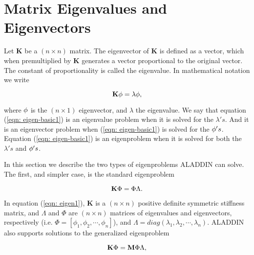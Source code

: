 \clearpage
\section{Matrix Eigenvalues and Eigenvectors}

\vspace{0.15 in}
\noindent\hspace{0.50 in}
Let {\bf K} be a $(n \times n)$ matrix.
The eigenvector of {\bf K} is defined as a vector, which when
premultiplied by {\bf K} generates a vector proportional to the original vector.
The constant of proportionality is called the eigenvalue.
In mathematical notation we write

\begin{equation}
{\bf K} {\bf \phi} = \lambda {\bf \phi},
\label{eqn: eigen-basic1}
\end{equation}

\vspace{0.15 in}\noindent
where ${\bf \phi}$ is the $(n \times 1)$ eigenvector, and $\lambda$ the eigenvalue.
We say that equation (\ref{eqn: eigen-basic1})
is an eigenvalue problem when it is solved for the $\lambda's$.
And it is an eigenvector problem
when (\ref{eqn: eigen-basic1}) is solved for the ${\bf \phi}'s$.
Equation (\ref{eqn: eigen-basic1}) is an eigenproblem when it is solved
for both the $\lambda's$ and ${\bf \phi}'s$.

\vspace{0.15 in}
\noindent\hspace{0.50 in}
In this section we describe the two types of
eigenproblems ALADDIN can solve. The first, and simpler case,
is the standard eigenproblem

\begin{equation}
{\bf K} \Phi = \Phi \Lambda.
\label{eqn: eigen1}
\end{equation}

\vspace{0.15 in}\noindent
In equation (\ref{eqn: eigen1}), {\bf K} is a $(n \times n)$ positive definite
symmetric stiffness matrix, and $\Lambda$ and $\Phi$ are $(n \times n)$ matrices of
eigenvalues and eigenvectors,
respectively (i.e. $\Phi = \left[ \phi_1, \phi_2, \cdots , \phi_n \right]$),
and $\Lambda = diag(\lambda_1, \lambda_2, \cdots, \lambda_n)$.
ALADDIN also supports solutions to the generalized eigenproblem

\begin{equation}
{\bf K} \Phi = {\bf M} \Phi \Lambda,
\label{eqn: eigen2}
\end{equation}

